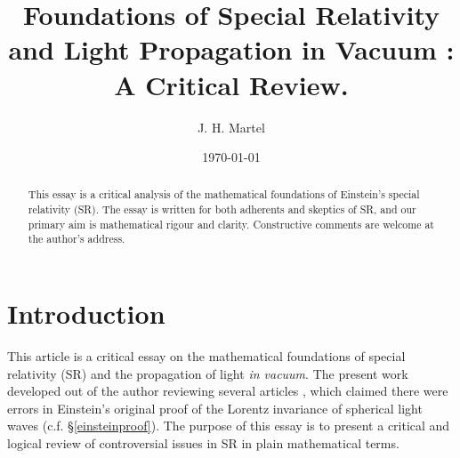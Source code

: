 \documentclass[12pt]{article}
\begin{document}
\title{Foundations of Special Relativity and Light Propagation in Vacuum : A Critical Review.}


\author{J. H. Martel}
\date{\today}
\maketitle

\begin{abstract}
This essay is a critical analysis of the mathematical foundations of Einstein's special relativity (SR). The essay is written for both adherents and skeptics of SR, and our primary aim is mathematical rigour and clarity. Constructive comments are welcome at the author's address. 




\end{abstract}
\tableofcontents







\section*{Introduction}
This article is a critical essay on the mathematical foundations of special relativity (SR) and the propagation of light \emph{in vacuum}. The present work developed out of the author reviewing several articles \cite{bryant}, \cite{crothers} which claimed there were errors in Einstein's original proof of the Lorentz invariance of spherical light waves (c.f. \S \ref{einsteinproof}). The purpose of this essay is to present a critical and logical review of controversial issues in SR in plain mathematical terms. 
\end{document}
